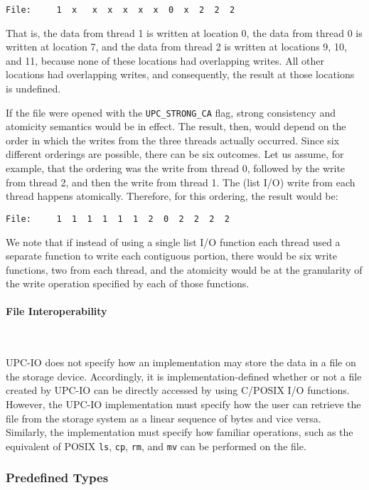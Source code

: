 \documentclass[12pt,titlepage]{article}
\newcounter{parnum}
\newcommand\np{\addtocounter{parnum}{1}\hspace{-2em}\makebox[2em][l]{\arabic{parnum}}}
\begin{document}
\begin{verbatim}
File:     1  x   x  x  x  x  x  0  x  2  2  2
\end{verbatim}
\np That is, the data from thread 1 is written at location 0, the data from
thread 0 is written at location 7, and the data from thread 2 is written at
locations 9, 10, and 11, because none of these locations had overlapping
writes. All other locations had overlapping writes, and consequently, the
result at those locations is undefined.

\np If the file were opened with the {\tt UPC\_STRONG\_CA} flag, strong
consistency and atomicity semantics would be
in effect. The result, then, would depend on the order in which the writes
from the three threads actually occurred. Since six different orderings are
possible, there can be six outcomes. Let us assume, for example, that the
ordering was the write from thread 0, followed by the write from thread 2,
and then the write from thread 1. The (list I/O) write from each thread
happens atomically. Therefore, for this ordering, the result would be:

\begin{verbatim}
File:     1  1  1  1  1  1  2  0  2  2  2  2
\end{verbatim}

\np We note that if instead of using a single list I/O function each thread used
a separate function to write each contiguous portion, there would be six
write functions, two from each thread, and the atomicity would be at the
granularity of the write operation specified by each of those functions.

\paragraph{File Interoperability}\ \\

\np UPC-IO does not specify how an implementation may store the data in a file
on the storage device. Accordingly, it is implementation-defined whether or not 
a file created by UPC-IO can be directly accessed by using C/POSIX I/O functions.
However, the UPC-IO implementation must specify how
the user can retrieve the file from the storage system as a linear sequence
of bytes and vice versa. Similarly, the implementation must specify how
familiar operations, such as the equivalent of POSIX {\tt ls}, {\tt cp}, {\tt rm}, and {\tt mv} can
be performed on the file.

\subsubsection{Predefined Types}
\end{document}
